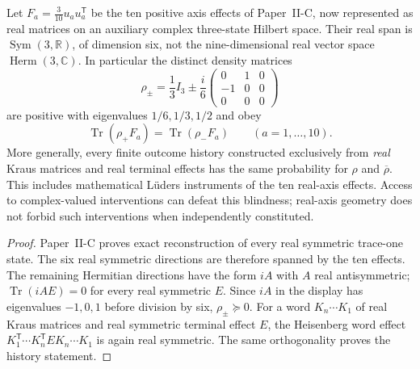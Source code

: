 \documentclass[12pt,a4paper]{article}
\begin{document}
\begin{proposition}
\label{p4a:prop:v320-real-axis-blindness}
Let $F_a=\frac3{10}u_a u_a^{\mathsf T}$ be the ten positive
axis effects of Paper~II-C, now represented as real matrices on an
auxiliary complex three-state Hilbert space. Their real span is
$\operatorname{Sym}(3,\mathbb R)$, of dimension six, not the
nine-dimensional real vector space $\operatorname{Herm}(3,\mathbb C)$.
In particular the distinct density matrices
\[
 \rho_\pm=\frac13I_3\pm\frac{i}{6}
 \begin{pmatrix}0&1&0\\-1&0&0\\0&0&0\end{pmatrix}
\]
are positive with eigenvalues $1/6,1/3,1/2$ and obey
\[
 \operatorname{Tr}(\rho_+F_a)
 =\operatorname{Tr}(\rho_-F_a)\qquad(a=1,\ldots,10).
\]
More generally, every finite outcome history constructed exclusively
from \emph{real} Kraus matrices and real terminal effects has the
same probability for $\rho$ and $\overline\rho$. This includes
mathematical L\"uders instruments of the ten real-axis effects.
Access to complex-valued interventions can defeat this blindness;
real-axis geometry does not forbid such interventions when independently
constituted.
\end{proposition}
\begin{proof}
Paper~II-C proves exact reconstruction of every real symmetric
trace-one state. The six real symmetric directions are therefore
spanned by the ten effects. The remaining Hermitian directions have
the form $iA$ with $A$ real antisymmetric; $\operatorname{Tr}(iA E)=0$
for every real symmetric $E$. Since $iA$ in the display has eigenvalues
$-1,0,1$ before division by six, $\rho_\pm\succeq0$.
For a word $K_n\cdots K_1$ of real Kraus matrices and real symmetric
terminal effect $E$, the Heisenberg word effect
$K_1^{\mathsf T}\cdots K_n^{\mathsf T}E K_n\cdots K_1$ is again real
symmetric. The same orthogonality proves the history statement.
\end{proof}
\end{document}
